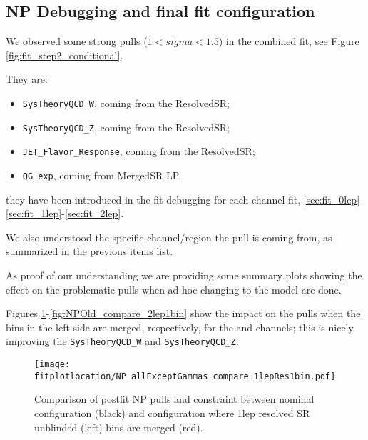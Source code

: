 \clearpage
\subsection{NP Debugging and final fit configuration}
\label{sec:fit_decorrStudies}

\renewcommand{\fitplotlocation}{./figures/StatisticalInterpretation_SMApp/combinedfitpulls/}

We observed some strong pulls ($1 < sigma < 1.5$) in the combined fit, see Figure \ref{fig:fit_step2_conditional}.

They are:

\begin{itemize}
  \item \texttt{SysTheoryQCD\_W}, coming from the \olep ResolvedSR;

  \item \texttt{SysTheoryQCD\_Z}, coming from the \tlep ResolvedSR;


  \item \texttt{JET\_Flavor\_Response}, coming from the \zlep ResolvedSR;

  \item \texttt{QG\_exp}, coming from \olep MergedSR LP.

\end{itemize}

they have been introduced in the fit debugging for each channel fit, 
\ref{sec:fit_0lep}-\ref{sec:fit_1lep}-\ref{sec:fit_2lep}.

We also understood the specific channel/region the pull is coming from, as summarized in the previous items list.

As proof of our understanding we are providing some summary plots showing the effect on the problematic pulls
when ad-hoc changing to the model are done.

Figures \ref{fig:NPOld_compare_1lep1bin}-\ref{fig:NPOld_compare_2lep1bin}
show the impact on the pulls when the bins in the left side are merged, respectively, for the \olep and \tlep channels; 
this is nicely improving the \texttt{SysTheoryQCD\_W} and \texttt{SysTheoryQCD\_Z}.

\begin{figure}[ht]
  \centering
	\texttt{[image: \\fitplotlocation/NP\_allExceptGammas\_compare\_1lepRes1bin.pdf]}
	\caption{Comparison of postfit NP pulls and constraint between nominal configuration (black) and configuration where 1lep resolved SR unblinded (left) bins are merged (red).}
  \label{fig:NPOld_compare_1lep1bin}
\end{figure}

